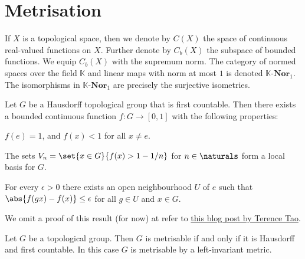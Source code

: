 \documentclass[article, a4paper, 11pt, oneside]{memoir}
\numberwithin{equation}{chapter}
\begin{document}


\section{Metrisation}

\newcommand{\cat}[1]{\mathcal{#1}}
\newcommand{\scat}[1]{\mathbf{#1}} %
\newcommand{\ncat}[1]{\mathbf{#1}} %

\newcommand{\scatC}{\scat{C}}

\newcommand{\catNor}[1]{{#1\text{-}\scat{Nor}}}
\newcommand{\catNorReal}{\catNor{\reals}}

\newcommand{\field}{\mathbb{K}}

If $X$ is a topological space, then we denote by $C(X)$ the space of continuous real-valued functions on $X$. Further denote by $C_b(X)$ the subspace of bounded functions. We equip $C_b(X)$ with the supremum norm. The category of normed spaces over the field $\field$ and linear maps with norm at most $1$ is denoted $\catNor{\field}_1$. The isomorphisms in $\catNor{\field}_1$ are precisely the surjective isometries.

\begin{lemma}
    \label{thm:birkhoff-kakutani-lemma}
    Let $G$ be a Hausdorff topological group that is first countable. Then there exists a bounded continuous function $f \colon G \to [0,1]$ with the following properties:
    \begin{enumlem}
        \item \label{enum:birkhoff-kakutani-lemma-unique-maximum} $f(e) = 1$, and $f(x) < 1$ for all $x \neq e$.
        \item \label{enum:birkhoff-kakutani-lemma-nhood-basis} The sets $V_n = \set{x \in G}{f(x) > 1-1/n}$ for $n \in \naturals$ form a local basis for $G$.
        \item \label{enum:birkhoff-kakutani-lemma-uniform-continuity} For every $\epsilon > 0$ there exists an open neighbourhood $U$ of $e$ such that $\abs{f(gx) - f(x)} \leq \epsilon$ for all $g \in U$ and $x \in G$.
    \end{enumlem}
\end{lemma}
%
We omit a proof of this result (for now) at refer to \href{https://terrytao.wordpress.com/2011/05/17/the-birkhoff-kakutani-theorem/}{this blog post by Terence Tao}.


\begin{theorem}
    Let $G$ be a topological group. Then $G$ is metrisable if and only if it is Hausdorff and first countable. In this case $G$ is metrisable by a left-invariant metric.
\end{theorem}
\end{document}

